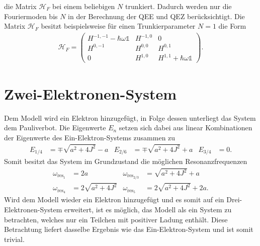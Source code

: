 die Matrix $\mathcal{H}_F$ bei
einem beliebigen $N$ trunkiert.
Dadurch werden nur die Fouriermoden bis $N$ in der
Berechnung der QEE und QEZ
berücksichtigt.
Die Matrix $\mathcal{H}_F$ besitzt beispielsweise
für einen Trunkierparameter $N=1$ die Form
\begin{align}
  \mathcal{H}_F=\begin{pmatrix}
  H^{-1,-1}-\hbar\omega\mathbb{1} &  H^{-1,0} &   0 \\
  H^{0,-1}               &  H^{0,0}  &H^{0,1}                  \\
      0                  &  H^{1,0}  & H^{1,1}+\hbar\omega\mathbb{1}
\end{pmatrix}.
\end{align}

\section{Zwei-Elektronen-System}
Dem Modell wird ein Elektron
hinzugefügt, in Folge dessen
unterliegt das System dem Pauliverbot.
Die Eigenwerte $E_n$ setzen sich dabei aus
linear Kombinationen der Eigenwerte
des Ein-Elektron-Systems
zusammen \cite{phillip} zu
\begin{align}
E_{1/4}&=\mp\sqrt{a^2+4J^2}-a
&E_{2/6}&=\mp\sqrt{a^2+4J^2}+a
&E_{3/4}&=0.
\end{align}
Somit besitzt das System im Grundzustand die möglichen Resonanzfrequenzen
\begin{align}
\omega_{\text{res}_1}&=2a
&\omega_{\text{res}_{2/3}}&=\sqrt{a^2+4J^2}+a \\
\omega_{\text{res}_4}&=2\sqrt{a^2+4J^2}
&\omega_{\text{res}_5}&=2\sqrt{a^2+4J^2}+2a.
\end{align}
Wird dem Modell wieder ein Elektron
hinzugefügt und es somit auf ein
Drei-Elektronen-System erweitert, ist es
möglich, das Modell als ein System
zu betrachten, welches nur ein
Teilchen mit positiver Ladung enthält.
Diese Betrachtung liefert dasselbe Ergebnis
wie das Ein-Elektron-System und
ist somit trivial. \cite{phillip}
